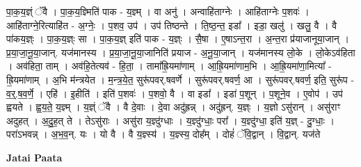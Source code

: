 \documentclass[17pt]{extarticle}
\begin{document}
पा॒क॒य॒ज्ञ्ं ॅवै । पा॒क॒य॒ज्ञ्मिति॑ पाक - य॒ज्ञ्म् । वा अनु॑ । अन्वाहि॑ताग्नेः । आहि॑ताग्नेः प॒शवः॑ । आहि॑ताग्ने॒रित्याहि॑त - अ॒ग्नेः॒ । प॒शव॒ उप॑ । उप॑ तिष्ठन्ते । ति॒ष्ठ॒न्त॒ इडा᳚ । इडा॒ खलु॑ । खलु॒ वै । वै पा॑कय॒ज्ञ्ः । पा॒क॒य॒ज्ञ्ः सा । पा॒क॒य॒ज्ञ् इति॑ पाक - य॒ज्ञ्ः । सै॒षा । ए॒षाऽन्त॒रा । अ॒न्त॒रा प्र॑याजानूया॒जान् । प्र॒या॒जा॒नू॒या॒जान्. यज॑मानस्य । प्र॒या॒जा॒नू॒या॒जानिति॑ प्रयाज - अ॒नू॒या॒जान् । यज॑मानस्य लो॒के । लो॒केऽव॑हिता । अव॑हिता॒ ताम् । अव॑हि॒तेत्यव॑ - हि॒ता॒ । तामा᳚ह्रि॒यमा॑णाम् । आ॒ह्रि॒यमा॑णाम॒भि । आ॒ह्रि॒यमा॑णा॒मित्या᳚ - ह्रि॒यमा॑णाम् । अ॒भि म॑न्त्रयेत । म॒न्त्र॒ये॒त॒ सुरू॑पवर्.षवर्णे । सुरू॑पवर्.षवर्ण॒ आ । सुरू॑पवर्.षवर्ण॒ इति॒ सुरू॑प - व॒र्॒.ष॒व॒र्णे॒ । एहि॑ । इ॒हीति॑ । इति॑ प॒शवः॑ । प॒शवो॒ वै । वा इडा᳚ । इडा॑ प॒शून् । प॒शूने॒व । ए॒वोप॑ । उप॑ ह्वयते । ह्व॒य॒ते॒ य॒ज्ञ्म् । य॒ज्ञ्ं ॅवै । वै दे॒वाः । दे॒वा अदु॑ह्रन्न् । अदु॑ह्रन्. य॒ज्ञ्ः । य॒ज्ञो ऽसु॑रान् । असु॑राꣳ अदुहत् । अ॒दु॒ह॒त् ते । तेऽसु॑राः । असु॑रा य॒ज्ञ्दु॑ग्धाः । य॒ज्ञ्दु॑ग्धाः॒ परा᳚ । य॒ज्ञ्दु॑ग्धा॒ इति॑ य॒ज्ञ् - दु॒ग्धाः॒ । परा॑ऽभवन्न् । अ॒भ॒व॒न्. यः । यो वै । वै य॒ज्ञ्स्य॑ । य॒ज्ञ्स्य॒ दोह᳚म् । दोहं॑ ॅवि॒द्वान् । वि॒द्वान्. यज॑ते \newline

\textbf{Jatai Paata} \newline
\end{document}
